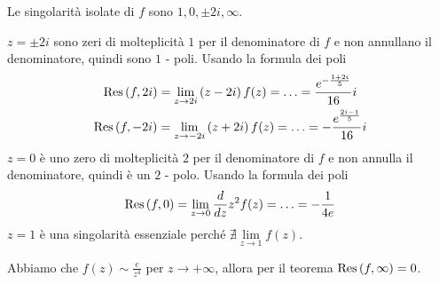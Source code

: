 Le singolarità isolate di $f$ sono $1, 0, \pm 2i, \infty $.

$z = \pm 2i$ sono zeri di molteplicità $1$ per il denominatore di $f$ e non annullano il denominatore, quindi sono $1$ - poli. Usando la formula dei poli
\begin{gather*}
\operatorname{Res} \left(f, 2i\right) = \lim\limits_{z\rightarrow 2i}\left(z - 2i\right) f(z) = \dotsc = \frac{e^{- \frac{1 + 2i}{5}}}{16} i\\
\operatorname{Res} \left(f, - 2i\right) = \lim\limits_{z\rightarrow - 2i}\left(z + 2i\right) f(z) = \dotsc = - \frac{e^{\frac{2i - 1}{5}}}{16} i
\end{gather*}
$z = 0$ è uno zero di molteplicità $2$ per il denominatore di $f$ e non annulla il denominatore, quindi è un $2$ - polo. Usando la formula dei poli
\begin{equation*}
\operatorname{Res} \left(f, 0\right) = \lim\limits_{z\rightarrow 0}\frac{d}{dz} z^{2} f(z) = \dotsc = - \frac{1}{4e}
\end{equation*}
$z = 1$ è una singolarità essenziale perché $\nexists \lim\limits_{z\rightarrow 1} f(z)$.

Abbiamo che $f(z) \sim \frac{e}{z^{4}}$ per $z\rightarrow + \infty $, allora per il teorema $\operatorname{Res} \left(f, \infty \right) = 0$.

